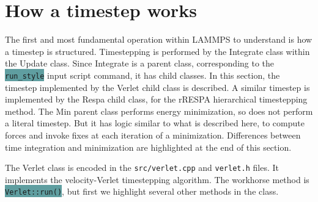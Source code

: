 \documentclass{article}
\newcommand{\path}[1]{\colorbox{light-gray}{\texttt{#1}}}
\newcommand{\code}[1]{\colorbox{cadetblue}{\color{white}\texttt{#1}}}
\begin{document}

\pagebreak
\section{How a timestep works}

The first and most fundamental operation within LAMMPS to understand
is how a timestep is structured.  Timestepping is performed by the
Integrate class within the Update class.  Since Integrate is a parent
class, corresponding to the \code{run\_style} input script command, it has
child classes.  In this section, the timestep implemented by the
Verlet child class is described.  A similar timestep is implemented by
the Respa child class, for the rRESPA hierarchical timestepping
method.  The Min parent class performs energy minimization, so does
not perform a literal timestep.  But it has logic similar to what is
described here, to compute forces and invoke fixes at each iteration
of a minimization.  Differences between time integration and
minimization are highlighted at the end of this section.

The Verlet class is encoded in the \path{src/verlet.cpp} and \path{verlet.h} files.
It implements the velocity-Verlet timestepping algorithm.  The
workhorse method is \code{Verlet::run()}, but first we highlight several
other methods in the class.
\end{document}
